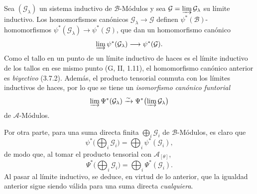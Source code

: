 \begin{env}[4.3.2]
\label{0.4.3.2-fr}
Sea $(\mathcal{G}_\lambda)$ un sistema inductivo de $\mathcal{B}$-Módulos
y sea $\mathcal{G}=\varinjlim\mathcal{G}_\lambda$ su límite inductivo. Los
homomorfismos canónicos $\mathcal{G}_\lambda\to\mathcal{G}$ definen
$\psi^*(\mathcal{B})$-homomorfismos
$\psi^*(\mathcal{G}_\lambda)\to\psi^*(\mathcal{G})$, que dan un
homomorfismo canónico
\[
  \varinjlim\psi^*(\mathcal{G}_\lambda)
  \longrightarrow
  \psi^*(\mathcal{G}).
\]
Como el tallo en un punto de un límite inductivo de haces es el límite
inductivo de los tallos en ese mismo punto (G, II, 1.11), el homomorfismo
canónico anterior es \emph{biyectivo} (3.7.2). Además, el producto tensorial
conmuta con los límites inductivos de haces, por lo que se tiene un
\emph{isomorfismo canónico funtorial}
\[
  \varinjlim\Psi^*(\mathcal{G}_\lambda)
  \xrightarrow{\sim}
  \Psi^*\bigl(\varinjlim\mathcal{G}_\lambda\bigr)
\]
de $\mathcal{A}$-Módulos.

Por otra parte, para una suma directa finita $\bigoplus_i\mathcal{G}_i$ de
$\mathcal{B}$-Módulos, es claro que
\[
  \psi^*\bigl(\bigoplus_i\mathcal{G}_i\bigr)
  =\bigoplus_i\psi^*(\mathcal{G}_i),
\]
de modo que, al tomar el producto tensorial con $\mathcal{A}_{[\theta]}$,
\[
  \Psi^*\bigl(\bigoplus_i\mathcal{G}_i\bigr)
  =\bigoplus_i\Psi^*(\mathcal{G}_i).
  \tag{4.3.2.1}\label{0.4.3.2.1-fr}
\]
Al pasar al límite inductivo, se deduce, en virtud de lo anterior, que la
igualdad anterior sigue siendo válida para una suma directa
\emph{cualquiera}.
\end{env}

